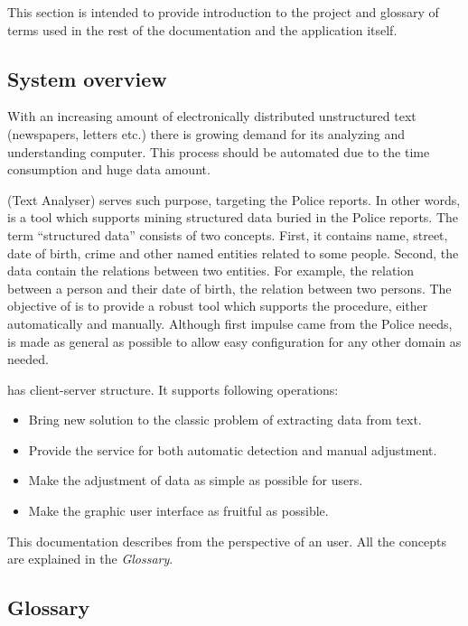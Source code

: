 

This section is intended to provide introduction to the project and glossary of
terms used in the rest of the documentation and the application itself.

\subsection{System overview}

With an increasing amount of electronically distributed unstructured text (newspapers,
letters etc.) there is growing demand for its analyzing and understanding computer.
This process should be automated due to the time consumption and huge data amount.


\textan{} (Text Analyser) serves such purpose, targeting the Police reports. 
In other words, \textan{} is a tool which supports mining structured data buried
in the Police reports. The term ``structured data'' consists of two concepts. 
First, it contains name, street, date of birth, crime and other named entities related to some people. 
Second, the data contain the relations between two entities. 
For example, the relation between a person and their date of birth, the relation between two persons. The objective of \textan{} is to provide a robust tool which supports the procedure, either automatically and manually.
Although first impulse came from the Police needs, \textan{} is made as general
as possible to allow easy configuration for any other domain as needed.

\textan{} has client-server structure. It supports following operations: 
  
\begin{itemize}
  \item Bring new solution to the classic problem of extracting data from text.
  \item Provide the service for both automatic detection and manual adjustment.
  \item Make the adjustment of data as simple as possible for users.
  \item Make the graphic user interface as fruitful as possible.
\end{itemize}

This documentation describes \textan{} from the perspective of an user. 
All the concepts are explained in the \emph{Glossary}. 

\subsection{Glossary}

